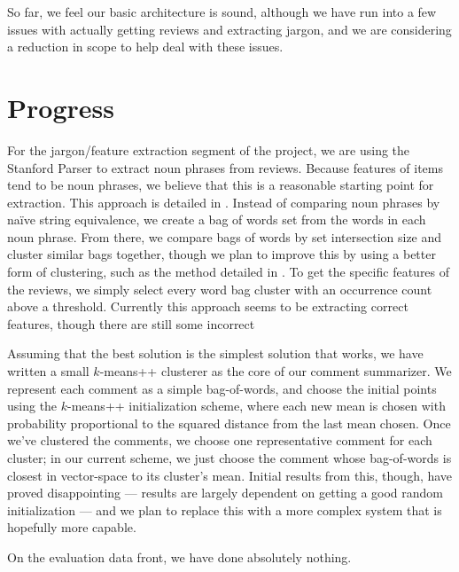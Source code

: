 \documentclass{article}
\begin{document}
So far, we feel our basic architecture is sound, although we have run into a
few issues with actually getting reviews and extracting jargon, and we are
considering a reduction in scope to help deal with these issues.

\section{Progress}
For the jargon/feature extraction segment of the project, we are using the Stanford Parser to extract noun phrases from reviews.  Because features of items tend to be noun phrases, we believe that this is a reasonable starting point for extraction.  This approach is detailed in \cite{opine}.  Instead of comparing noun phrases by na\" ive string equivalence, we create a bag of words set from the words in each noun phrase.  From there, we compare bags of words by set intersection size and cluster similar bags together, though we plan to improve this by using a better form of clustering, such as the method detailed in \cite{lexrank}.  To get the specific features of the reviews, we simply select every word bag cluster with an occurrence count above a threshold.  Currently this approach seems to be extracting correct features, though there are still some incorrect 


Assuming that the best solution is the simplest solution that works, we have
written a small $k$-means++ clusterer as the core of our comment summarizer. We
represent each comment as a simple bag-of-words, and choose the initial points
using the $k$-means++ initialization scheme, where each new mean is chosen
with probability proportional to the squared distance from the last mean
chosen. Once we've clustered the comments, we choose one representative comment
for each cluster; in our current scheme, we just choose the comment whose
bag-of-words is closest in vector-space to its cluster's mean.
Initial results from this, though, have proved disappointing --- results
are largely dependent on getting a good random initialization --- and
we plan to replace this with a more complex system that is hopefully more
capable.

On the evaluation data front, we have done absolutely nothing.
\end{document}
